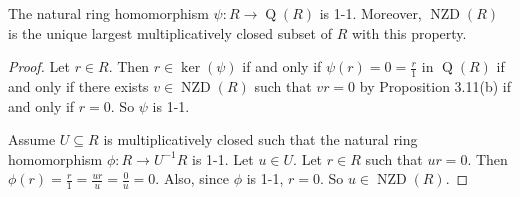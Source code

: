 \begin{example*}
\begin{enumerate}
\begin{comment}
                \ \ \ \ \ \ 
                \begin{tikzpicture}[node distance = 1.5cm, auto]
                    \node (R) {$R_2$};
                    \node (QR)[right of=R] {$\operatorname{Q}(R_2)$};
                    \node (L)[below of=QR] {$U^{-1}R_2$};
                    \node (r)[node distance=0.7cm, left of=R, above of=R] {$r_2$};
                    \node (qr)[node distance=0.7cm, right of=QR, above of=QR] {$\frac{r_2}{1}$};
                    \node (qru)[node distance=1.6cm, right of=QR] {$\frac{r_2}{u_2}$};
                    \node (lu)[below of=qru] {$\frac{\varphi_2(r_2)}{\varphi_2(u_2)}$};
                    \node (l)[node distance=0.7cm, below of=L] {$r_2/1 = \frac{r_2/1}{1/1}$};
                    \draw[->] (R) to node {$\psi_2$} (QR);
                    \draw[right hook->] (R) to node [swap]{$\varphi_2$} (L);
                    \draw[->,dashed] (QR) to node {$\ex !\ \overbar \varphi_2$} (L);
                    \draw[|->] (r) to node {} (qr);
                    \draw[|->,bend right] (r) to node {} (l);
                    \draw[|->,bend left=45] (qr) to node {} (l);
                    \draw[|->] (qru) to node {} (lu);
                \end{tikzpicture}
            \end{center}
            Thus, $\operatorname{Q}(R) \cong \operatorname{Q}(R/\langle \overbar{X}, \overbar{Z} \rangle) \times \operatorname{Q}(R/\langle \overbar{Y}, \overbar{W} \rangle) \cong \operatorname{Q}(k[Y,W]) \times \operatorname{Q}(k[X,Z]) \cong k(X,Z) \times k(Y,W)$ by (a).
        \end{comment}
    \end{enumerate}
\end{example*}

\begin{proposition}
    The natural ring homomorphism $\psi: R \to \operatorname{Q}(R)$ is 1-1. Moreover, $\operatorname{NZD}(R)$ is the unique largest multiplicatively closed subset of $R$ with this property.
\end{proposition}

\begin{proof}
    Let $r \in R$. Then $r \in \ker(\psi)$ if and only if $\psi(r) = 0 = \frac{r}{1}$ in $\operatorname{Q}(R)$ if and only if there exists $v \in \operatorname{NZD}(R)$ such that $vr = 0$ by Proposition 3.11(b) if and only if $r = 0$. So $\psi$ is 1-1. \par
    Assume $U \subseteq R$ is multiplicatively closed such that the natural ring homomorphism $\phi: R \to U^{-1}R$ is 1-1. Let $u \in U$. Let $r \in R$ such that $ur = 0$. Then $\phi(r) = \frac{r}{1} = \frac{ur}{u} = \frac{0}{u} = 0$. Also, since $\phi$ is 1-1, $r = 0$. So $u \in \operatorname{NZD}(R)$.
\end{proof}

